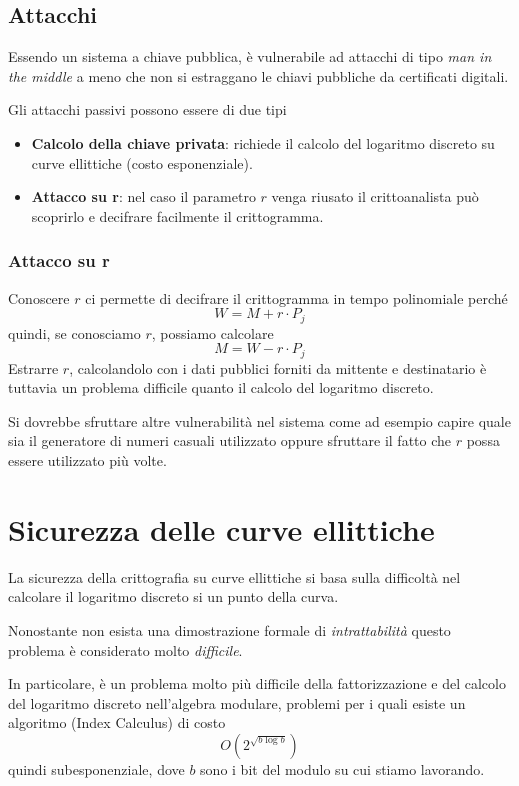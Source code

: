 \subsection{Attacchi}
Essendo un sistema a chiave pubblica, \`e vulnerabile ad attacchi di tipo \emph{man in the middle} a meno che non
si estraggano le chiavi pubbliche da certificati digitali.

Gli attacchi passivi possono essere di due tipi
\begin{itemize}
	\item \textbf{Calcolo della chiave privata}: richiede il calcolo del logaritmo discreto su curve ellittiche
	      (costo esponenziale).
	\item \textbf{Attacco su r}: nel caso il parametro $r$ venga riusato il crittoanalista pu\`o scoprirlo e
	      decifrare facilmente il crittogramma.
\end{itemize}

\subsubsection{Attacco su r}
Conoscere $r$ ci permette di decifrare il crittogramma in tempo polinomiale perch\'e
\[ W = M + r \cdot P_j \]
quindi, se conosciamo $r$, possiamo calcolare
\[ M = W - r \cdot P_j \]
Estrarre $r$, calcolandolo con i dati pubblici forniti da mittente e destinatario \`e tuttavia un problema difficile
quanto il calcolo del logaritmo discreto.

Si dovrebbe sfruttare altre vulnerabilit\`a nel sistema come ad esempio capire quale sia il generatore di numeri
casuali utilizzato oppure sfruttare il fatto che $r$ possa essere utilizzato pi\`u volte.

\section{Sicurezza delle curve ellittiche}
La sicurezza della crittografia su curve ellittiche si basa sulla difficolt\`a nel calcolare il logaritmo discreto
si un punto della curva.

Nonostante non esista una dimostrazione formale di \emph{intrattabilit\`a} questo problema \`e considerato molto
\emph{difficile}.

In particolare, \`e un problema molto pi\`u difficile della fattorizzazione e del calcolo del logaritmo discreto
nell'algebra modulare, problemi per i quali esiste un algoritmo (Index Calculus) di costo
\[ O(2^{\sqrt{b \log b}}) \]
quindi subesponenziale, dove $b$ sono i bit del modulo su cui stiamo lavorando.

